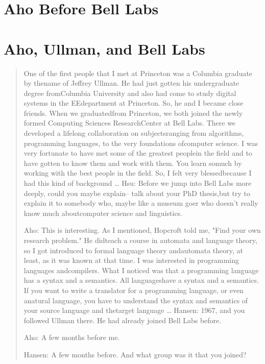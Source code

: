 \section{Aho Before Bell Labs}
\section{Aho, Ullman, and Bell Labs}
\begin{quotation}
    One of the first people that I met at Princeton was a Columbia graduate by thename of Jeffrey Ullman. He had just gotten his undergraduate degree fromColumbia University and also had come to study digital systems in the EEdepartment at Princeton. So, he and I became close friends. When we graduatedfrom Princeton, we both joined the newly formed Computing Sciences ResearchCenter at Bell Labs. There we developed a lifelong collaboration on subjectsranging from algorithms, programming languages, to the very foundations ofcomputer science. I was very fortunate to have met some of the greatest peoplein the field and to have gotten to know them and work with them. You learn somuch by working with the best people in the field. So, I felt very blessedbecause I had this kind of background
\dots
Hsu: Before we jump into Bell Labs more deeply, could you maybe explain-- talk about your PhD thesis,but try to explain it to somebody who, maybe like a museum goer who doesn't really know much aboutcomputer science and linguistics.

Aho: This is interesting. As I mentioned, Hopcroft told me, "Find your own research problem." He didteach a course in automata and language theory, so I got introduced to formal language theory andautomata theory, at least, as it was known at that time. I was interested in programming languages andcompilers. What I noticed was that a programming language has a syntax and a semantics. All languageshave a syntax and a semantics. If you want to write a translator for a programming language, or even anatural language, you have to understand the syntax and semantics of your source language and thetarget language
\dots
Hansen: 1967, and you followed Ullman there. He had already joined Bell Labs before.

Aho: A few months before me.

Hansen: A few months before. And what group was it that you joined?


\end{quotation}
